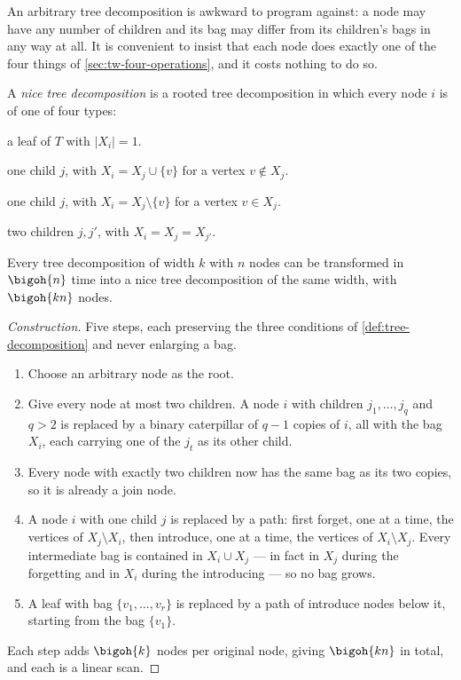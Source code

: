 An arbitrary tree decomposition is awkward to program against: a node may have
any number of children and its bag may differ from its children's bags in any
way at all. It is convenient to insist that each node does exactly one of the
four things of \cref{sec:tw-four-operations}, and it costs nothing to do so.

\begin{definition}\label{def:nice-decomposition}
A \emph{nice tree decomposition} is a rooted tree decomposition in which every
node $i$ is of one of four types:
\begin{description}[leftmargin=1.2em,style=nextline,nosep]
  \item[Leaf:] a leaf of $T$ with $|X_i| = 1$.
  \item[Introduce:] one child $j$, with $X_i = X_j \cup \{v\}$ for a vertex
        $v \notin X_j$.
  \item[Forget:] one child $j$, with $X_i = X_j \setminus \{v\}$ for a vertex
        $v \in X_j$.
  \item[Join:] two children $j, j'$, with $X_i = X_j = X_{j'}$.
\end{description}
\end{definition}

\begin{lemma}\label{lem:nice-decomposition}
Every tree decomposition of width $k$ with $n$ nodes can be transformed in
$\bigoh{n}$ time into a nice tree decomposition of the same width, with
$\bigoh{kn}$ nodes.
\end{lemma}

\begin{proof}[Construction]
Five steps, each preserving the three conditions of
\cref{def:tree-decomposition} and never enlarging a bag.
\begin{enumerate}[leftmargin=*]
  \item Choose an arbitrary node as the root.
  \item Give every node at most two children. A node $i$ with children
        $j_1,\ldots,j_q$ and $q > 2$ is replaced by a binary caterpillar of
        $q-1$ copies of $i$, all with the bag $X_i$, each carrying one of the
        $j_t$ as its other child.
  \item Every node with exactly two children now has the same bag as its two
        copies, so it is already a join node.
  \item A node $i$ with one child $j$ is replaced by a path: first forget, one
        at a time, the vertices of $X_j \setminus X_i$, then introduce, one at
        a time, the vertices of $X_i \setminus X_j$. Every intermediate bag is
        contained in $X_i \cup X_j$ --- in fact in $X_j$ during the forgetting
        and in $X_i$ during the introducing --- so no bag grows.
  \item A leaf with bag $\{v_1,\ldots,v_r\}$ is replaced by a path of introduce
        nodes below it, starting from the bag $\{v_1\}$.
\end{enumerate}
Each step adds $\bigoh{k}$ nodes per original node, giving $\bigoh{kn}$ in
total, and each is a linear scan.
\end{proof}

